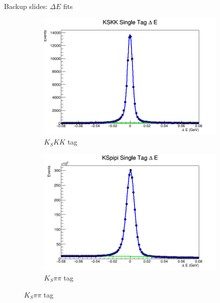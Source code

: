 \documentclass{beamer}
\begin{document}
\begin{frame}{Backup slides: $\Delta E$ fits}
  \begin{figure}
    \centering
    \vspace{-0.2cm}
    \begin{subfigure}{0.5\textwidth}
      \includegraphics[width = 1\textwidth]{KSKKDeltaE.png}
      \caption{$K_SKK$ tag}
    \end{subfigure}%
    \begin{subfigure}{0.5\textwidth}
      \includegraphics[width = 1\textwidth]{KSpipiDeltaE.png}
      \caption{$K_S\pi\pi$ tag}
    \end{subfigure}
  \end{figure}
\end{frame}
\end{document}
